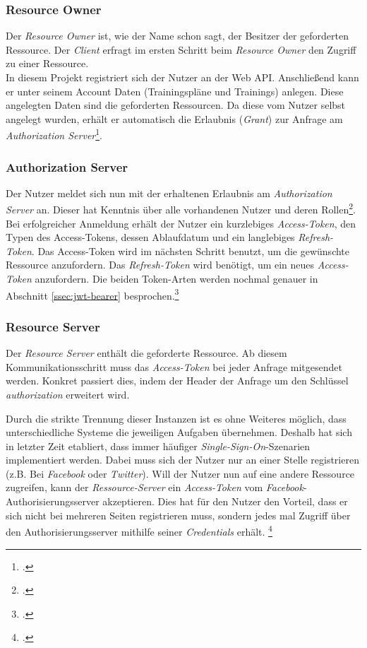 \subsubsection*{Resource Owner}
Der \textit{Resource Owner} ist, wie der Name schon sagt, der Besitzer der geforderten Ressource. Der \textit{Client} erfragt im ersten Schritt beim \textit{Resource Owner} den Zugriff zu einer Ressource.\\
In diesem Projekt registriert sich der Nutzer an der Web \ac{API}. Anschließend kann er unter seinem Account Daten (Trainingspläne und Trainings) anlegen. Diese angelegten Daten sind die geforderten Ressourcen. Da diese vom Nutzer selbst angelegt wurden, erhält er automatisch die Erlaubnis (\textit{Grant}) zur Anfrage am \textit{Authorization Server}\footcite{online:Implemented_OAuth_WebToken}.
\subsubsection*{Authorization Server}
\label{sssec:authorization-server}
Der Nutzer meldet sich nun mit der erhaltenen Erlaubnis am \textit{Authorization Server} an. Dieser hat Kenntnis über alle vorhandenen Nutzer und deren Rollen\footcite{online:Implemented_OAuth_Roles}. Bei erfolgreicher Anmeldung erhält der Nutzer ein kurzlebiges \textit{Access-Token}, den Typen des Access-Tokens, dessen Ablaufdatum und ein langlebiges \textit{Refresh-Token}. Das Access-Token wird im nächsten Schritt benutzt, um die gewünschte Ressource anzufordern. Das \textit{Refresh-Token} wird benötigt, um ein neues \textit{Access-Token} anzufordern. Die beiden Token-Arten werden nochmal genauer in Abschnitt \ref{ssec:jwt-bearer} besprochen.\footcite[S. 287]{book:AngularJs:Steyer2015} 
\subsubsection*{Resource Server}
Der \textit{Resource Server} enthält die geforderte Ressource. Ab diesem Kommunikationsschritt muss das \textit{Access-Token} bei jeder Anfrage mitgesendet werden. Konkret passiert dies, indem der Header der Anfrage um den Schlüssel \textit{authorization} erweitert wird.

Durch die strikte Trennung dieser Instanzen ist es ohne Weiteres möglich, dass unterschiedliche Systeme die jeweiligen Aufgaben übernehmen. Deshalb hat sich in letzter Zeit etabliert, dass immer häufiger \textit{Single-Sign-On}-Szenarien implementiert werden. Dabei muss sich der Nutzer nur an einer Stelle registrieren (z.B. Bei \textit{Facebook} oder \textit{Twitter}). Will der Nutzer nun auf eine andere Ressource zugreifen, kann der \textit{Ressource-Server} ein \textit{Access-Token} vom \textit{Facebook}-Authorisierungsserver akzeptieren. Dies hat für den Nutzer den Vorteil, dass er sich nicht bei mehreren Seiten registrieren muss, sondern jedes mal Zugriff über den Authorisierungsserver mithilfe seiner \textit{Credentials} erhält. \footcite[S. 294]{book:AngularJs:Steyer2015} 
